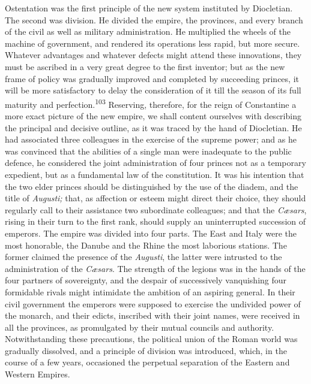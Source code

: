 

Ostentation was the first principle of the new system instituted
by Diocletian. The second was division. He divided the empire,
the provinces, and every branch of the civil as well as military
administration. He multiplied the wheels of the machine of
government, and rendered its operations less rapid, but more
secure. Whatever advantages and whatever defects might attend
these innovations, they must be ascribed in a very great degree
to the first inventor; but as the new frame of policy was
gradually improved and completed by succeeding princes, it will
be more satisfactory to delay the consideration of it till the
season of its full maturity and perfection.\textsuperscript{103} Reserving,
therefore, for the reign of Constantine a more exact picture of
the new empire, we shall content ourselves with describing the
principal and decisive outline, as it was traced by the hand of
Diocletian. He had associated three colleagues in the exercise of
the supreme power; and as he was convinced that the abilities of
a single man were inadequate to the public defence, he considered
the joint administration of four princes not as a temporary
expedient, but as a fundamental law of the constitution. It was
his intention that the two elder princes should be distinguished
by the use of the diadem, and the title of \textit{Augusti;} that, as
affection or esteem might direct their choice, they should
regularly call to their assistance two subordinate colleagues;
and that the \textit{Cæsars}, rising in their turn to the first rank,
should supply an uninterrupted succession of emperors. The empire
was divided into four parts. The East and Italy were the most
honorable, the Danube and the Rhine the most laborious stations.
The former claimed the presence of the \textit{Augusti}, the latter were
intrusted to the administration of the \textit{Cæsars}. The strength of
the legions was in the hands of the four partners of sovereignty,
and the despair of successively vanquishing four formidable
rivals might intimidate the ambition of an aspiring general. In
their civil government the emperors were supposed to exercise the
undivided power of the monarch, and their edicts, inscribed with
their joint names, were received in all the provinces, as
promulgated by their mutual councils and authority.
Notwithstanding these precautions, the political union of the
Roman world was gradually dissolved, and a principle of division
was introduced, which, in the course of a few years, occasioned
the perpetual separation of the Eastern and Western Empires.


